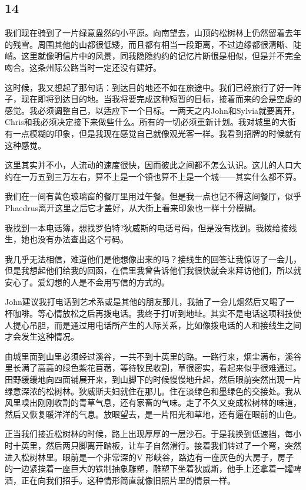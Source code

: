 \documentclass[UTF8]{article}
\begin{document}
\subsection*{14}
\par 我们现在骑到了一片绿意盎然的小平原。向南望去，山顶的松树林上仍然留着去年的残雪。周围其他的山都很低矮，而且都有相当一段距离，不过边缘都很清晰、陡峭。这里就像明信片中的风景，同我隐隐约约的记忆片断很是相似，但是并不完全吻合。这条州际公路当时一定还没有建好。
\par 这时候，我又想起了那句话：到达目的地还不如在旅途中。我们已经旅行了好一阵子，现在即将到达目的地。当我将要完成这种短暂的目标，接着而来的会是空虚的感觉。我必须调整自己，以适应下一个目标。一两天之内John和Sylvia就要离开，Chris和我必须决定接下来做些什么。所有的一切必须重新计划。我对城里的大街有一点模糊的印象，但是我现在感觉自己就像观光客一样。我看到招牌的时候就有这种感觉。
\par 这里其实并不小，人流动的速度很快，因而彼此之间都不怎么认识。这儿的人口大约在一万五到三万左右，算不上是一个镇也算不上是一个城——其实什么都不算。
\par 我们在一间有黄色玻璃窗的餐厅里用过午餐。但是我一点也记不得这间餐厅，似乎Phaedrus离开这里之后它才盖好，从大街上看来印象也一样十分模糊。
\par 我找到一本电话簿，想找罗伯特?狄威斯的电话号码，但是没有找到。我拨给接线生，她也没有办法查出这个号码。
\par 我几乎无法相信，难道他们是他想像出来的吗？接线生的回答让我惊讶了一会儿，但是我想起他们给我的回函，在信里我曾告诉他们我很快就会来拜访他们，所以就安心了。爱幻想的人是不会用写信的方式的。
\par John建议我打电话到艺术系或是其他的朋友那儿，我抽了一会儿烟然后又喝了一杯咖啡。等心情放松之后再拨电话。我终于打听到地址。其实不是电话这项科技使人提心吊胆，而是通过用电话所产生的人际关系，比如像拨电话的人和接线生之间才会发生这种情况。
\par 由城里面到山里必须经过溪谷，一共不到十英里的路。一路行来，烟尘满布，溪谷里长满了高高的绿色紫花苜蓿，等待牧民收割，草很密实，看起来似乎很难通过。田野缓缓地向四面铺展开来，到山脚下的时候慢慢地升起，然后眼前突然出现一片绿意深浓的松树林。狄威斯夫妇就住在那儿。住在淡绿色和墨绿色的交接处。我从风里嗅出刚刚收割的青草气息，还有家畜的气味。走了不久又变成松树林的味道，然后又恢复暖洋洋的气息。放眼望去，是一片阳光和草地，还有逼在眼前的山色。
\par 正当我们接近松树林的时候，路上出现厚厚的一层沙石。于是我换到低速挡，每小时十英里，然后两只脚离开踏板，让车子自然滑行。接着我们转过了一个弯，突然进入松树林里。眼前是一个非常深的V 形峡谷，路边有一座灰色的大房子，房子的一边紧挨着一座巨大的铁制抽象雕塑，雕塑下坐着狄威斯，他手上还拿着一罐啤酒，正在向我们招手。这种情形简直就像旧照片里的情景一样。
\end{document}
